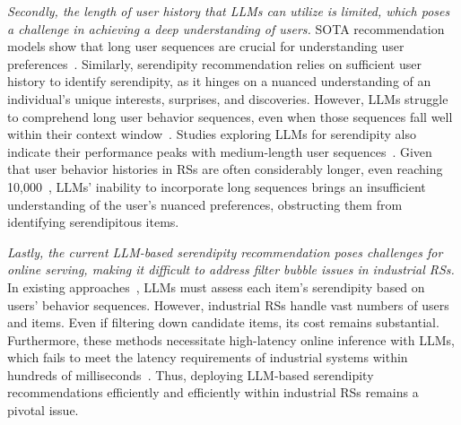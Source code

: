 \textit{Secondly, the length of user history that LLMs can utilize is limited, which poses a challenge in achieving a deep understanding of users.} SOTA recommendation models show that long user sequences are crucial for understanding user preferences~\cite{hou2024cross,si2024twin,feng2024context}. Similarly, serendipity recommendation relies on sufficient user history to identify serendipity, as it hinges on a nuanced understanding of an individual’s unique interests, surprises, and discoveries. However, LLMs struggle to comprehend long user behavior sequences, even when those sequences fall well within their context window~\cite{lin2024rella}. Studies exploring LLMs for serendipity also indicate their performance peaks with medium-length user sequences~\cite{tokutake2024can}. 
Given that user behavior histories in RSs are often considerably longer, even reaching 10,000~\cite{hou2024cross,si2024twin}, LLMs' inability to incorporate long sequences brings an insufficient understanding of the user’s nuanced preferences, obstructing them from identifying serendipitous items.


\textit{Lastly, the current LLM-based serendipity recommendation poses challenges for online serving, making it difficult to address filter bubble issues in industrial RSs.} In existing approaches~\cite{tokutake2024can,fu2024art}, LLMs must assess each item's serendipity based on users' behavior sequences. However, industrial RSs handle vast numbers of users and items. Even if filtering down candidate items, its cost remains substantial. Furthermore, these methods necessitate high-latency online inference with LLMs, which fails to meet the latency requirements of industrial systems within hundreds of milliseconds~\cite{xi2023device}. Thus, deploying LLM-based serendipity recommendations efficiently and efficiently within industrial RSs remains a pivotal issue.


